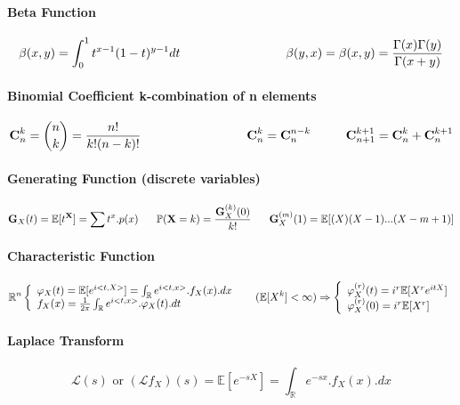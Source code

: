 \documentclass[a4paper,10pt]{article}
\begin{document}
\paragraph{Beta Function}
\[
\beta(x,y)=  \int_{0}^{1}  t^{x-1}(1-t)^{y-1}dt  \hspace{30mm} \beta(y,x)=\beta(x,y)= \frac{\Gamma(x)\Gamma(y)}{\Gamma(x+y)}
\]
\paragraph{Binomial Coefficient k-combination of n elements}
\[
\textbf{C}^{k}_{n} = \binom{n}{k} = \frac{n!}{k!(n-k)!}
\hspace{30mm} \textbf{C}^{k}_{n} = \textbf{C}^{n-k}_{n} 
\hspace{10mm} \textbf{C}^{k+1}_{n+1} = \textbf{C}^{k}_{n} + \textbf{C}^{k+1}_{n} 
\]

\paragraph{Generating Function (discrete variables)}
\[
\textbf{G}_{X}(t)= \mathbb{E}[t^{\textbf{X}}] = \sum t^{x}.p(x)
\hspace{6mm} \mathbb{P}(\textbf{X}=k) = \frac{\textbf{G}_{X}^{(k)}(0)}{k!}
\hspace{6mm} \textbf{G}_{X}^{(m)}(1)  = \mathbb{E}[(X)(X-1)...(X-m+1)]
\]
\paragraph{Characteristic Function}
\[
\mathbb{R}^{n}
\left\{
\begin{array}{l}
\varphi_{X}(t)= \mathbb{E}[e^{i<t,X>}] = \int_{\mathbb{R}} e^{i<t,x>} . f_{X}(x).dx \\
f_{X}(x) = \frac{1}{2\pi}\int_{\mathbb{R}} e^{i<t,x>} . \varphi_{X}(t).dt
\end{array}\right. 
\hspace{5mm}
(\mathbb{E}[X^{k}]< \infty) \Rightarrow 
\left\{
\begin{array}{l}
\varphi_{X}^{(r)}(t)= i^{r}\mathbb{E}[X^{r}e^{itX}] \\
\varphi_{X}^{(r)}(0)= i^{r}\mathbb{E}[X^{r}]
\end{array}\right. 
\]

\paragraph{Laplace Transform}
\[
\mathcal{L}(s) \text{ or }  (\mathcal{L}f_{X})(s) = \mathbb{E}[e^{-sX}] = \int_{\mathbb{R}} e^{-sx} . f_{X}(x).dx 
\]
\end{document}
